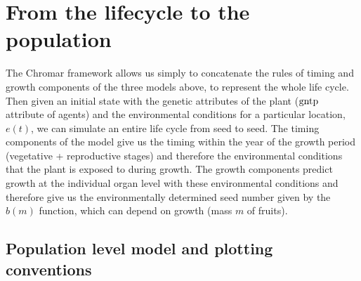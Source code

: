 \section{From the lifecycle to the population}
\label{sec:pop}
The Chromar framework allows us simply to concatenate the rules of timing and
growth components of the three models above, to represent the whole life
cycle. Then given an initial state with the genetic attributes of the plant
(\(\mathrm{gntp}\) attribute of agents) and the environmental conditions for a
particular location, \(e(t)\), we can simulate an entire life cycle from seed to
seed. The timing components of the model give us the timing within the year of
the growth period (vegetative + reproductive stages) and therefore the
environmental conditions that the plant is exposed to during growth. The growth
components predict growth at the individual organ level with these environmental
conditions and therefore give us the environmentally determined seed number
given by the \(b(m)\) function, which can depend on growth (mass $m$ of fruits).


\subsection{Population level model and plotting conventions}
\label{population-level-model-and-plotting-conventions}

